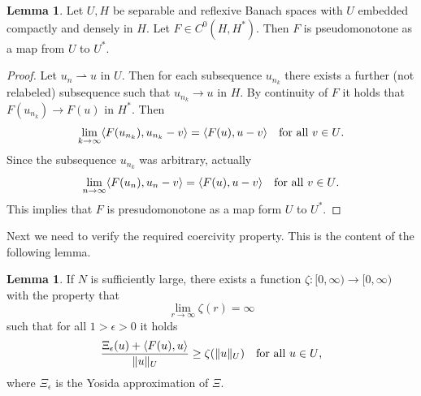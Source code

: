 \documentclass[a4paper,10pt,oneside]{amsbook}
\numberwithin{section}{chapter}
\numberwithin{equation}{chapter}
\theoremstyle{definition}
\newtheorem{lemma}[prop]{Lemma}
\DeclarePairedDelimiter{\norm}{\lVert}{\rVert}
\DeclarePairedDelimiter{\dual}{\langle}{\rangle}
\begin{document}
\begin{lemma}
Let $U,H$ be separable and reflexive Banach spaces with $U$ embedded compactly and densely in $H$. Let $F\in C^0(H,H^*)$. Then $F$ is pseudomonotone as a map from $U$ to $U^*$.
\end{lemma}
\begin{proof}
Let $u_n\rightharpoonup u$ in $U$. Then for each subsequence $u_{n_k}$ there exists a further (not relabeled) subsequence such that $u_{n_k}\to u$ in $H$. By continuity of $F$ it holds that $F(u_{n_k})\to F(u)$ in $H^*$. Then
\[
\lim_{k\to\infty}\dual{F(u_{n_k}),u_{n_k}-v}=\dual{F(u),u-v}\quad\text{for all $v\in U$}.
\]
Since the subsequence $u_{n_k}$ was arbitrary, actually
\[
\lim_{n\to\infty}\dual{F(u_{n}),u_{n}-v}=\dual{F(u),u-v}\quad\text{for all $v\in U$}.
\]
This implies that $F$ is presudomonotone as a map form $U$ to $U^*$.
\end{proof}
Next we need to verify the required coercivity property. This is the content of the following lemma.
\begin{lemma}
If $N$ is sufficiently large, there exists a function $\zeta\colon[0,\infty)\to[0,\infty)$ with the property that
\[
\lim_{r\to\infty}\zeta(r)=\infty
\]
such that for all $1>\epsilon>0$ it holds
\[
\frac{\Xi_\epsilon(u)+\dual{F(u),u}}{\norm{u}_U}\ge\zeta(\norm{u}_U)\quad\text{for all $u\in U$,}
\]
where $\Xi_\epsilon$ is the Yosida approximation of $\Xi$.
\end{lemma}
\end{document}
